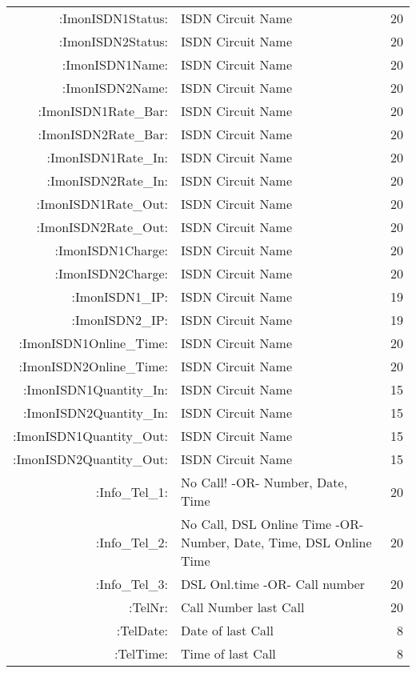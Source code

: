 \begin{description}
\begin{small}
\begin{center}
\begin{longtable}{rp{7cm}r}
       :ImonISDN1Status: &       ISDN Circuit Name            &  20 \\
       :ImonISDN2Status: &       ISDN Circuit Name            &  20 \\
         :ImonISDN1Name: &       ISDN Circuit Name            &  20 \\
         :ImonISDN2Name: &       ISDN Circuit Name            &  20 \\
    :ImonISDN1Rate\_Bar: &       ISDN Circuit Name            &  20 \\
    :ImonISDN2Rate\_Bar: &       ISDN Circuit Name            &  20 \\
     :ImonISDN1Rate\_In: &       ISDN Circuit Name            &  20 \\
     :ImonISDN2Rate\_In: &       ISDN Circuit Name            &  20 \\
    :ImonISDN1Rate\_Out: &       ISDN Circuit Name            &  20 \\
    :ImonISDN2Rate\_Out: &       ISDN Circuit Name            &  20 \\
       :ImonISDN1Charge: &       ISDN Circuit Name            &  20 \\
       :ImonISDN2Charge: &       ISDN Circuit Name            &  20 \\
         :ImonISDN1\_IP: &       ISDN Circuit Name            &  19 \\
         :ImonISDN2\_IP: &       ISDN Circuit Name            &  19 \\
 :ImonISDN1Online\_Time: &       ISDN Circuit Name            &  20 \\
 :ImonISDN2Online\_Time: &       ISDN Circuit Name            &  20 \\
 :ImonISDN1Quantity\_In: &       ISDN Circuit Name            &  15 \\
 :ImonISDN2Quantity\_In: &       ISDN Circuit Name            &  15 \\
:ImonISDN1Quantity\_Out: &       ISDN Circuit Name            &  15 \\
:ImonISDN2Quantity\_Out: &       ISDN Circuit Name            &  15 \\

          :Info\_Tel\_1: &       No Call! -OR- Number, Date, Time      &  20 \\
          :Info\_Tel\_2: &       No Call, DSL Online Time -OR- Number, Date, Time, DSL Online Time    &  20 \\
          :Info\_Tel\_3: &       DSL Onl.time -OR- Call number &  20 \\
                 :TelNr: &       Call Number last Call         &  20 \\
               :TelDate: &       Date of last Call             &   8 \\
               :TelTime: &       Time of last Call             &   8 \\
       

\end{longtable}
\end{center}
\end{small}
\end{description}

